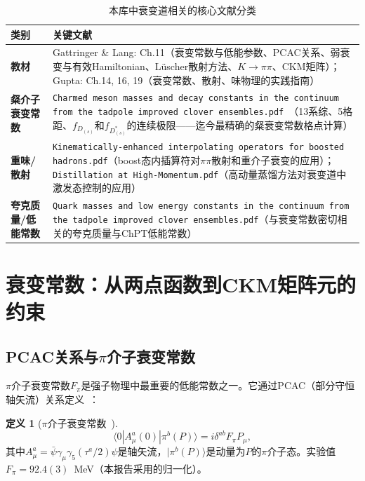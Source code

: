 \documentclass[12pt,a4paper]{ctexart}
\theoremstyle{definition}
\newtheorem{definition}{定义}[section]
\begin{document}
\begin{table}[H]
\centering
\caption{本库中衰变道相关的核心文献分类}
\label{tab:decay_papers}
\small
\begin{tabular}{lp{9cm}}
\toprule
类别 & 关键文献 \\
\midrule
\textbf{教材} &
Gattringer \& Lang: Ch.11（衰变常数与低能参数、PCAC关系、弱衰变与有效Hamiltonian、L\"uscher散射方法、$K\to\pi\pi$、CKM矩阵）；Gupta: Ch.14, 16, 19（衰变常数、散射、味物理的实践指南）\\
\textbf{粲介子衰变常数} &
\texttt{Charmed meson masses and decay constants in the continuum from the tadpole improved clover ensembles.pdf}~\cite{CharmedClover}（13系综、5格距、$f_{D_{(s)}}$和$f_{D_{(s)}^*}$的连续极限——迄今最精确的粲衰变常数格点计算）\\
\textbf{重味/散射} &
\texttt{Kinematically-enhanced interpolating operators for boosted hadrons.pdf}（boost态内插算符对$\pi\pi$散射和重介子衰变的应用）；\texttt{Distillation at High-Momentum.pdf}（高动量蒸馏方法对衰变道中激发态控制的应用）\\
\textbf{夸克质量/低能常数} &
\texttt{Quark masses and low energy constants in the continuum from the tadpole improved clover ensembles.pdf}（与衰变常数密切相关的夸克质量与ChPT低能常数）\\
\bottomrule
\end{tabular}
\end{table}

\section{衰变常数：从两点函数到CKM矩阵元的约束}

\subsection{PCAC关系与$\pi$介子衰变常数}

\newcommand{\gtl}{Gattringer \& Lang}

$\pi$介子衰变常数$F_\pi$是强子物理中最重要的低能常数之一。它通过PCAC（部分守恒轴矢流）关系定义~\cite{GattringerLang2010}：

\begin{definition}[$\pi$介子衰变常数~\cite{GattringerLang2010}]
\begin{equation}
\boxed{\langle 0 | A_\mu^{a}(0) | \pi^b(P) \rangle = i \delta^{ab} F_\pi P_\mu},
\label{eq:Fpi_def}
\end{equation}
其中$A_\mu^a = \bar\psi \gamma_\mu\gamma_5 (\tau^a/2)\psi$是轴矢流，$|\pi^b(P)\rangle$是动量为$P$的$\pi$介子态。实验值$F_\pi = 92.4(3)$~MeV（本报告采用的归一化）。
\end{definition}
\end{document}
